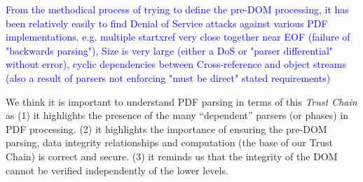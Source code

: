 

\textcolor{blue}{From the methodical process of trying to define the pre-DOM processing, it has been relatively easily to find Denial of Service attacks against various PDF implementations. e.g. multiple startxref very close together near EOF (failure of "backwards parsing"), Size is very large (either a DoS or "parser differential" without error), cyclic dependencies between Cross-reference and object streams (also a result of parsers not enforcing "must be direct" stated requirements)}



We think it is important to understand PDF parsing in terms of this
\emph{Trust Chain} as
%
(1) it highlights the presence of the many ``dependent'' parsers (or phases)
in PDF processing.
%
(2) it highlights the importance of ensuring the pre-DOM parsing, data integrity relationships and
computation (the base of our Trust Chain) is correct and secure.
%
(3) it reminds us that the integrity of the DOM cannot be verified
independently of the lower levels.


